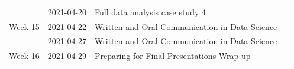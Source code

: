 \documentclass[
]{book}
\begin{document}
\begin{longtable}[]{@{}llll@{}}
\begin{minipage}[t]{0.22\columnwidth}
\end{minipage} & \begin{minipage}[t]{0.22\columnwidth}\raggedright
2021-04-20\strut
\end{minipage} & \begin{minipage}[t]{0.22\columnwidth}\raggedright
Full data analysis case study 4\strut
\end{minipage} & \begin{minipage}[t]{0.22\columnwidth}\raggedright
\strut
\end{minipage}\tabularnewline
\begin{minipage}[t]{0.22\columnwidth}\raggedright
Week 15\strut
\end{minipage} & \begin{minipage}[t]{0.22\columnwidth}\raggedright
2021-04-22\strut
\end{minipage} & \begin{minipage}[t]{0.22\columnwidth}\raggedright
Written and Oral Communication in Data Science\strut
\end{minipage} & \begin{minipage}[t]{0.22\columnwidth}\raggedright
\strut
\end{minipage}\tabularnewline
\begin{minipage}[t]{0.22\columnwidth}\raggedright
\strut
\end{minipage} & \begin{minipage}[t]{0.22\columnwidth}\raggedright
2021-04-27\strut
\end{minipage} & \begin{minipage}[t]{0.22\columnwidth}\raggedright
Written and Oral Communication in Data Science\strut
\end{minipage} & \begin{minipage}[t]{0.22\columnwidth}\raggedright
\strut
\end{minipage}\tabularnewline
\begin{minipage}[t]{0.22\columnwidth}\raggedright
Week 16\strut
\end{minipage} & \begin{minipage}[t]{0.22\columnwidth}\raggedright
2021-04-29\strut
\end{minipage} & \begin{minipage}[t]{0.22\columnwidth}\raggedright
Preparing for Final Presentations Wrap-up\strut
\end{minipage} & \begin{minipage}[t]{0.22\columnwidth}\raggedright
\strut
\end{minipage}\tabularnewline

\end{longtable}
\end{document}
